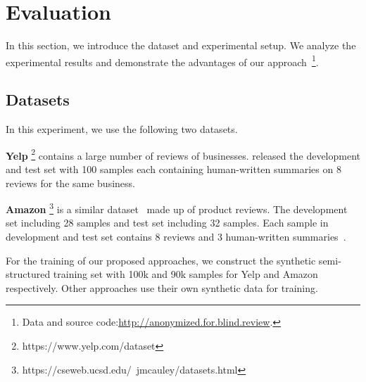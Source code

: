 \section{Evaluation}
\label{sec:eval}
In this section, we introduce the dataset and experimental setup.
We analyze the experimental results
and demonstrate the advantages of our approach~\footnote{ Data and source code:\url{http://anonymized.for.blind.review}.}.

\subsection{Datasets}
In this experiment, we use the following two datasets.

\textbf{Yelp} 
\footnote{https://www.yelp.com/dataset}
contains a large number of reviews of businesses.
\citet{MeanSum19} released the development and test set with 100 samples each
containing human-written summaries on 8 reviews for the same business.

\textbf{Amazon} 
\footnote{https://cseweb.ucsd.edu/~jmcauley/datasets.html}
is a similar dataset~\cite{HeM16} made up of product reviews. %
The development set including 28 samples and test set including 32 samples.
Each sample in development and test set contains 8 reviews and 3 human-written summaries~\cite{Copycat20}. 

For the training of our proposed approaches, we construct the synthetic semi-structured training set with 100k and 90k samples for Yelp and Amazon respectively.
Other approaches use their own synthetic data for training. 

